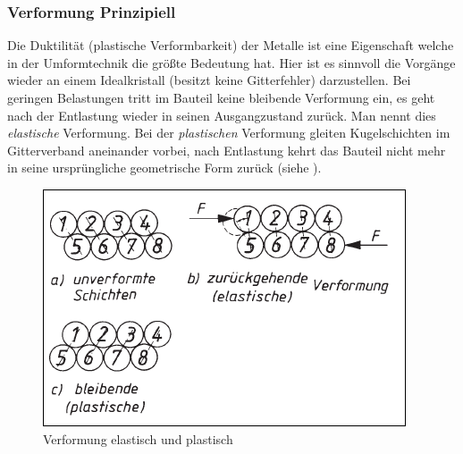 \documentclass[12pt,a4paper,parskip,twoside,BCOR5mm,headsepline]{scrartcl}
\begin{document}
\begin{description*}
{\subsubsection{Verformung Prinzipiell}
Die Duktilität (plastische Verformbarkeit) der Metalle ist eine Eigenschaft welche in der Umformtechnik die größte Bedeutung hat. Hier ist es sinnvoll die Vorgänge wieder an einem Idealkristall (besitzt keine Gitterfehler) darzustellen. Bei geringen Belastungen tritt im Bauteil keine bleibende Verformung ein, es geht nach  der Entlastung wieder in seinen Ausgangzustand zurück. Man nennt dies \emph{elastische} Verformung. Bei der \emph{plastischen} Verformung gleiten Kugelschichten im Gitterverband aneinander vorbei,  nach Entlastung kehrt das Bauteil nicht mehr in seine ursprüngliche geometrische Form zurück (siehe ).
\begin{figure}
\centering
\includegraphics[width=.8\textwidth]{eloplastkristall}
\caption[Verformung elastisch und plastisch]{Verformung elastisch und plastisch \autocite[45]{wk}}
\label{fig:eloplastkristall} 
\end{figure}

}
\end{description*}
\end{document}
